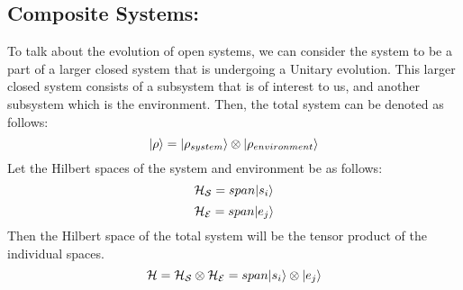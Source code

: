 \begin{comment}
    The study on quantum phenomenon is always observed using a closed system. But in reality, the system we live in is in contact with environment and is not exclusive from it. It means that the system is not isolated and the effect of the environment is there on the system. Due to this, it is crucial to develop a theoretical framework to interact and understand the quantum system.When we consider a pure state, there is no unitary evolution implemented on the state to convert it from a pure state to a mixed state. We find that the purity of the state is conserved in a unitary operation. But there are legitimate physical processes that constitute the transition from a pure state to a mixed state.Open quantum system can be defined as a quantum system that is in continuous interaction with the environment(which is also a quantum system).In this report, we study how to better formulate the interactions as these interactions with the environment significantly change the dynamics of the system and result in quantum dissipation.Applying the concepts learnt from open quantum systems, we can better understand the system, develop better tools to add the environment effect into the interaction while evolution occurs, remove the same when focus is needed on the system alone and make the theoretical interactions match the physical counterparts.
\end{comment}
\subsection{Composite Systems:}
    
   To talk about the evolution of open systems, we can consider the system to be a part of a larger closed system that is undergoing a Unitary evolution. This larger closed system consists of a subsystem that is of interest to us, and another subsystem which is the environment. Then, the total system can be denoted as follows:
   \begin{equation}
        \ket{\rho} = \ket{\rho_{system}} \otimes \ket{\rho_{environment}}
    \end{equation}
    Let the Hilbert spaces of the system and environment be as follows:
    \begin{equation}
        \mathcal{H_S} = span{\ket{s_i}}
    \end{equation}
    \begin{equation}
        \mathcal{H_E} = span{\ket{e_j}}
    \end{equation}
    Then the Hilbert space of the total system will be the tensor product of the individual spaces.
    \begin{equation}
        \mathcal{H} = \mathcal{H_S} \otimes \mathcal{H_E} 
                    = span{\ket{s_i} \otimes \ket{e_j}}
    \end{equation}
    
